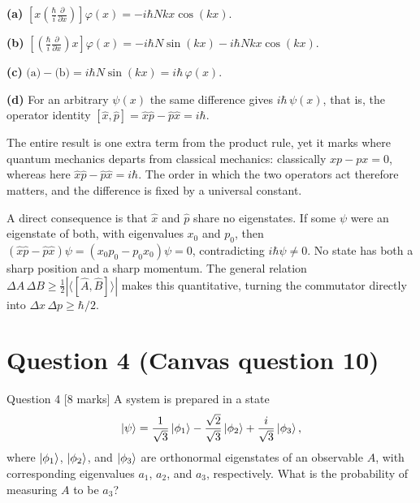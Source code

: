 \documentclass[12pt]{article}
\begin{document}
\begin{answerbox}
\textbf{(a)} $\left[x\left(\frac{\hbar}{i}\frac{\partial}{\partial x}\right)\right]\varphi(x)=-i\hbar Nkx\cos(kx)$.

\textbf{(b)} $\left[\left(\frac{\hbar}{i}\frac{\partial}{\partial x}\right)x\right]\varphi(x)=-i\hbar N\sin(kx)-i\hbar Nkx\cos(kx)$.

\textbf{(c)} $\text{(a)}-\text{(b)}=i\hbar N\sin(kx)=i\hbar\,\varphi(x)$.

\textbf{(d)} For an arbitrary $\psi(x)$ the same difference gives $i\hbar\,\psi(x)$, that is, the operator identity $\left[\hat{x},\hat{p}\right]=\hat{x}\hat{p}-\hat{p}\hat{x}=i\hbar$.
\end{answerbox}

\begin{insightbox}
The entire result is one extra term from the product rule, yet it marks where quantum mechanics departs from classical mechanics: classically $xp-px=0$, whereas here $\hat{x}\hat{p}-\hat{p}\hat{x}=i\hbar$. The order in which the two operators act therefore matters, and the difference is fixed by a universal constant.

A direct consequence is that $\hat{x}$ and $\hat{p}$ share no eigenstates. If some $\psi$ were an eigenstate of both, with eigenvalues $x_{0}$ and $p_{0}$, then $(\hat{x}\hat{p}-\hat{p}\hat{x})\psi=(x_{0}p_{0}-p_{0}x_{0})\psi=0$, contradicting $i\hbar\psi\neq 0$. No state has both a sharp position and a sharp momentum. The general relation $\Delta A\,\Delta B\ge\tfrac{1}{2}\left|\langle[\hat{A},\hat{B}]\rangle\right|$ makes this quantitative, turning the commutator directly into $\Delta x\,\Delta p\ge\hbar/2$.
\end{insightbox}
\fi

\newpage
\section{Question 4 (Canvas question 10)}
\begin{problembox}{Question 4 \hfill [8 marks]}
A system is prepared in a state
\[
    \ket{\psi} = \frac{1}{\sqrt{3}} \ket{\phi_1}
    - \frac{\sqrt{2}}{\sqrt{3}} \ket{\phi_2}
    + \frac{i}{\sqrt{3}} \ket{\phi_3},
\]
where \( \ket{\phi_1} \), \( \ket{\phi_2} \), and \( \ket{\phi_3} \) are orthonormal eigenstates of an observable \(A\), with corresponding eigenvalues \(a_1\), \(a_2\), and \(a_3\), respectively. What is the probability of measuring \(A\) to be \(a_3\)?
\end{problembox}
\end{document}
